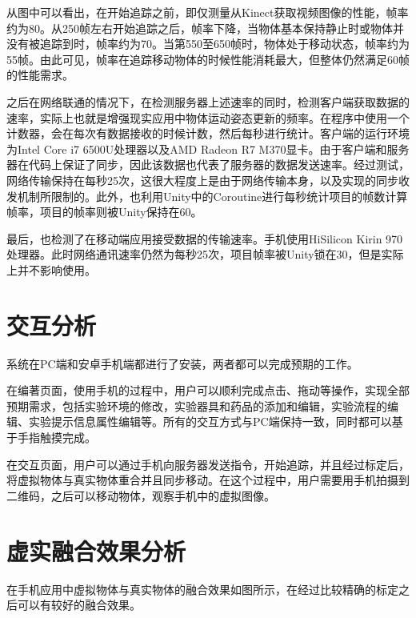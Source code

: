 从图中可以看出，在开始追踪之前，即仅测量从Kinect获取视频图像的性能，帧率约为80。从250帧左右开始追踪之后，帧率下降，当物体基本保持静止时或物体并没有被追踪到时，帧率约为70。当第550至650帧时，物体处于移动状态，帧率约为55帧。由此可见，帧率在追踪移动物体的时候性能消耗最大，但整体仍然满足60帧的性能需求。

之后在网络联通的情况下，在检测服务器上述速率的同时，检测客户端获取数据的速率，实际上也就是增强现实应用中物体运动姿态更新的频率。在程序中使用一个计数器，会在每次有数据接收的时候计数，然后每秒进行统计。客户端的运行环境为Intel Core i7 6500U处理器以及AMD Radeon R7 M370显卡。由于客户端和服务器在代码上保证了同步，因此该数据也代表了服务器的数据发送速率。经过测试，网络传输保持在每秒25次，这很大程度上是由于网络传输本身，以及实现的同步收发机制所限制的。此外，也利用Unity中的Coroutine进行每秒统计项目的帧数计算帧率，项目的帧率则被Unity保持在60。

最后，也检测了在移动端应用接受数据的传输速率。手机使用HiSilicon Kirin 970处理器。此时网络通讯速率仍然为每秒25次，项目帧率被Unity锁在30，但是实际上并不影响使用。

\section{交互分析}
系统在PC端和安卓手机端都进行了安装，两者都可以完成预期的工作。

在编著页面，使用手机的过程中，用户可以顺利完成点击、拖动等操作，实现全部预期需求，包括实验环境的修改，实验器具和药品的添加和编辑，实验流程的编辑、实验提示信息属性编辑等。所有的交互方式与PC端保持一致，同时都可以基于手指触摸完成。

在交互页面，用户可以通过手机向服务器发送指令，开始追踪，并且经过标定后，将虚拟物体与真实物体重合并且同步移动。在这个过程中，用户需要用手机拍摄到二维码，之后可以移动物体，观察手机中的虚拟图像。

\section{虚实融合效果分析}

在手机应用中虚拟物体与真实物体的融合效果如图所示，在经过比较精确的标定之后可以有较好的融合效果。